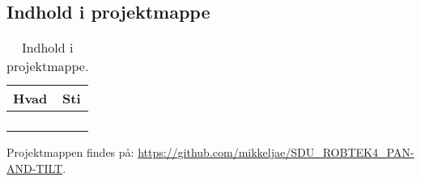 \tableofcontents
\subsection*{Indhold i projektmappe}
\begin{table}[th!]
\centering
\begin{tabular}{l|l}
Hvad&Sti\\\hline
&\\
&\\
&\\
&\\
\end{tabular}
\caption*{Indhold i projektmappe. \label{tb:CD}}
\end{table}

Projektmappen findes på:  \url{https://github.com/mikkeljae/SDU_ROBTEK4_PAN-AND-TILT}.
\clearpage
\listoffigures
\listoftables  
\listoftodos